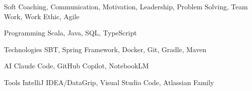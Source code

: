 

\begin{cvskills}

  \cvskill
    {Soft} %
    {Coaching, Communication, Motivation, Leadership, Problem Solving, Team Work, Work Ethic, Agile} %

  \cvskill
    {Programming} %
    {Scala, Java, SQL, TypeScript} %

  \cvskill
    {Technologies} %
    {SBT, Spring Framework, Docker, Git, Gradle, Maven} %

  \cvskill
    {AI} %
    {Claude Code, GitHub Copilot, NotebookLM} %
    
  \cvskill
    {Tools} %
    {IntelliJ IDEA/DataGrip, Visual Studio Code, Atlassian Family} %

\end{cvskills}
